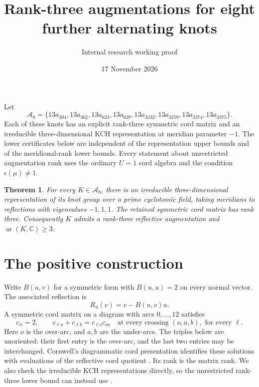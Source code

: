\documentclass[11pt]{article}
\title{Rank-three augmentations for eight further alternating knots}
\author{Internal research working proof}
\date{17 November 2026}
\newtheorem{theorem}{Theorem}
\newcommand{\ar}{\operatorname{ar}}
\begin{document}
\maketitle

Let
\[
\mathcal A_8=\{13a_{304},13a_{362},13a_{623},13a_{629},
13a_{3232},13a_{3259},13a_{3374},13a_{3375}\}.
\]
Each of these knots has an explicit rank-three symmetric cord matrix
and an irreducible three-dimensional KCH representation at meridian
parameter $-1$. The lower certificates below are independent of the
representation upper bounds and of the meridional-rank lower bounds.
Every statement about unrestricted augmentation rank uses the ordinary
$U=1$ cord algebra and the condition $\epsilon(\mu)\ne1$.

\begin{theorem}\label{thm:attainment}
For every $K\in\mathcal A_8$, there is an irreducible
three-dimensional representation of its knot group over a prime
cyclotomic field, taking meridians to reflections with eigenvalues
$-1,1,1$. The retained symmetric cord matrix has rank three.
Consequently $K$ admits a rank-three reflective augmentation and
$\ar(K,\mathbb C)\ge3$.
\end{theorem}

\section{The positive construction}

Write $B(u,v)$ for a symmetric form with $B(u,u)=2$ on every normal
vector. The associated reflection is
\[
                       R_u(v)=v-B(u,v)u.
\]
A symmetric cord matrix on a diagram with arcs $0,\ldots,12$ satisfies
\begin{equation}\label{eq:cord}
 c_{ii}=2,\qquad c_{\ell a}+c_{\ell b}=c_{\ell o}c_{oa}
 \quad\text{at every crossing }(o,a,b),\text{ for every }\ell.
\end{equation}
Here $o$ is the over-arc, and $a,b$ are the under-arcs.
The triples below are unoriented: their first entry is the over-arc,
and the last two entries may be interchanged.
Cornwell's diagrammatic cord presentation identifies these solutions
with evaluations of the reflective cord quotient
\cite[Theorem3.2 and Section3]{cornwell15}. Its rank is the matrix rank.
We also check the irreducible KCH representations directly, so the
unrestricted rank-three lower bound can instead use
\cite[Theorem1.2, Definition1.8 and Proposition2.12]{cornwell17}.
\end{document}
